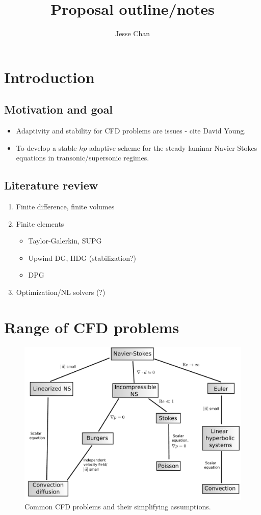 \documentclass{article}
\date{}
\author{Jesse Chan}
\title{Proposal outline/notes}
\begin{document}
\section{Introduction}

\subsection{Motivation and goal}

\begin{itemize}
\item Adaptivity and stability for CFD problems are issues - cite David Young.
\item To develop a stable $hp$-adaptive scheme for the steady laminar Navier-Stokes equations in transonic/supersonic regimes.
\end{itemize}

\subsection{Literature review}
\begin{enumerate}
\item Finite difference, finite volumes
\item Finite elements

\begin{itemize}
\item Taylor-Galerkin, SUPG
\item Upwind DG, HDG (stabilization?)
\item DPG
\end{itemize}

\item Optimization/NL solvers (?)
\end{enumerate}

\section{Range of CFD problems}

\begin{figure}[!h]
\centering
\includegraphics[scale=.4]{CFD_tree.pdf}
\caption{Common CFD problems and their simplifying assumptions.}
\end{figure}
\end{document}
